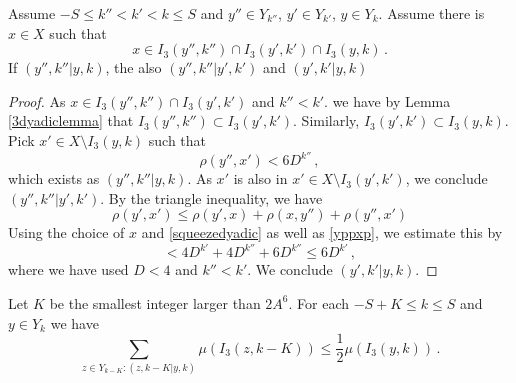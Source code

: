 \begin{lemma}\label{bdtrans}
Assume $-S\le k''< k'< k\le S$ and
$y''\in Y_{k''}$, $y'\in Y_{k'}$, $y\in Y_k$.
Assume there is $x\in X$ such that
\begin{equation}
x\in I_3(y'',k'')\cap I_3(y',k')\cap I_3(y,k)\, .
\end{equation}
If $(y'',k''|y,k)$, the also
$(y'',k''|y',k')$ and $(y',k'|y,k)$
\end{lemma}

\begin{proof}
As $x\in I_3(y'',k'')\cap I_3(y',k')$ and $k''< k'$.
we have by Lemma \ref{3dyadiclemma} that
$I_3(y'',k'')\subset I_3(y',k')$. Similarly,
$I_3(y',k')\subset I_3(y,k)$.
Pick $x'\in X\setminus I_3(y,k)$ such that
\begin{equation}\label{yppxp}
    \rho(y'',x')< 6D^{k''}\, ,
\end{equation}
which exists as $(y'',k''|y,k)$. As $x'$ is also in
$x'\in X\setminus I_3(y',k')$, we conclude
$(y'',k''|y',k')$.
By the triangle inequality, we have
\begin{equation}
\rho(y',x')\le  \rho(y',x)+\rho(x,y'')+\rho(y'',x')
\end{equation}
Using the choice of $x$ and \eqref{squeezedyadic}
as well as \eqref{yppxp}, we estimate this by
\begin{equation}
<  4D^{k'}+4D^{k''}+6D^{k''}\le 6D^{k'}\, ,
\end{equation}
where we have used $D<4$ and $k''<k'$.
We conclude $(y',k'|y,k)$.
\end{proof}

\begin{lemma}\label{david}
    Let $K$ be the smallest integer larger than
    $2A^6$. For each $-S+K\le k\le S$ and $y\in Y_k$ we have
    \begin{equation}
        \label{new small boundary}
        \sum_{z\in Y_{k-K}: (z,k-K|y,k)}\mu(I_3(z,k-K)) \le \frac 12 \mu(I_3(y,k))\,.
    \end{equation}
\end{lemma}

